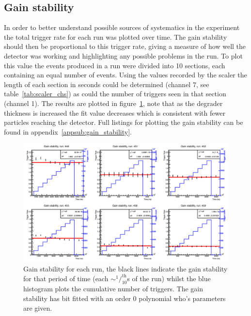 \subsection{Gain stability} %
\label{sub:gain_stability}
In order to better understand possible sources of systematics in the experiment the total trigger rate for each run was plotted over time. The gain stability should then be proportional to this trigger rate, giving a measure of how well the detector was working and highlighting any possible problems in the run. To plot this value the events produced in a run were divided into 10 sections, each containing an equal number of events. Using the values recorded by the scaler the length of each section in seconds could be determined (channel 7, see table~\ref{tab:scaler_chs}) as could the number of triggers seen in that section (channel 1). The results are plotted in figure~\ref{fig:gain_stability}, note that as the degrader thickness is increased the fit value decreases which is consistent with fewer particles reaching the detector. Full listings for plotting the gain stability can be found in appendix~\ref{appsub:gain_stability}.
%
\begin{figure}[htbp]
    \centering
        \includegraphics[width=\textwidth]{images/momentum_spectrum/gain_stability.png}
    \caption{Gain stability for each run, the black lines indicate the gain stability for that period of time (each $\sim^1/_{10}^{\text{th}}$s of the run) whilst the blue histogram plots the cumulative number of triggers. The gain stability has bit fitted with an order 0 polynomial who's parameters are given.}
    \label{fig:gain_stability}
\end{figure}
%
